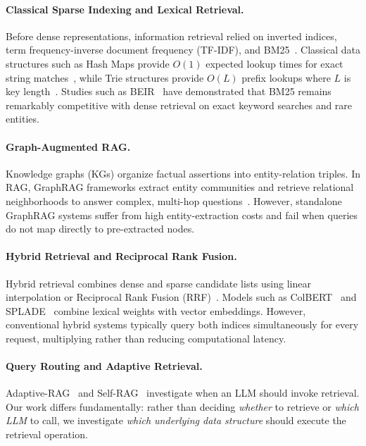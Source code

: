 \documentclass[10pt,twocolumn,letterpaper]{article}
\begin{document}
\paragraph{Classical Sparse Indexing and Lexical Retrieval.}
Before dense representations, information retrieval relied on inverted indices, term frequency-inverse document frequency (TF-IDF), and BM25~\cite{robertson2009probabilistic}. Classical data structures such as Hash Maps provide $O(1)$ expected lookup times for exact string matches~\cite{cormen2009introduction}, while Trie structures provide $O(L)$ prefix lookups where $L$ is key length~\cite{knuth1998art}. Studies such as BEIR~\cite{thakur2021beir} have demonstrated that BM25 remains remarkably competitive with dense retrieval on exact keyword searches and rare entities.

\paragraph{Graph-Augmented RAG.}
Knowledge graphs (KGs) organize factual assertions into entity-relation triples. In RAG, GraphRAG frameworks extract entity communities and retrieve relational neighborhoods to answer complex, multi-hop questions~\cite{edge2024local, yasunaga2021qa}. However, standalone GraphRAG systems suffer from high entity-extraction costs and fail when queries do not map directly to pre-extracted nodes.

\paragraph{Hybrid Retrieval and Reciprocal Rank Fusion.}
Hybrid retrieval combines dense and sparse candidate lists using linear interpolation or Reciprocal Rank Fusion (RRF)~\cite{cormack2009reciprocal}. Models such as ColBERT~\cite{khattab2020colbert} and SPLADE~\cite{formal2021splade} combine lexical weights with vector embeddings. However, conventional hybrid systems typically query both indices simultaneously for every request, multiplying rather than reducing computational latency.

\paragraph{Query Routing and Adaptive Retrieval.}
Adaptive-RAG~\cite{jeong2024adaptive} and Self-RAG~\cite{asai2023self} investigate when an LLM should invoke retrieval. Our work differs fundamentally: rather than deciding \textit{whether} to retrieve or \textit{which LLM} to call, we investigate \textit{which underlying data structure} should execute the retrieval operation.
\end{document}
